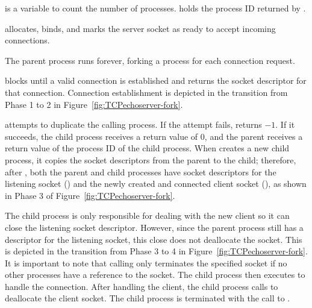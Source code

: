 \begin{topcode}



 is a variable to count the number of processes.
 holds the process ID returned by .


 allocates, binds, and marks the server
socket as ready to accept incoming connections.


The parent process runs forever, forking a process for each connection
request.

\begin{bottomcode}


 blocks until a valid connection is established
and returns the socket descriptor for that connection.
Connection establishment is depicted in the transition from Phase 1 to
2 in Figure~\ref{fig:TCPechoserver-fork}.


 attempts to duplicate the calling
process. If the attempt fails,  returns
$-1$.  If it succeeds, the child process
receives a return value of $0$, and the parent receives a
return value of the process ID of the child process.
When  creates a new child process, it copies the
socket descriptors from the parent to the child; therefore, after
,
both the parent and child processes have socket descriptors for the listening
socket () and the newly created and connected client
socket (),
as shown in Phase 3 of Figure~\ref{fig:TCPechoserver-fork}.


The child process is only responsible for dealing
with the new client so it can close the listening socket
descriptor. However, since the parent process still has a descriptor
for the listening socket, this close does not deallocate the socket.  This
is depicted in the transition from Phase 3 to 4 in
Figure~\ref{fig:TCPechoserver-fork}.  It is important to note that
calling  only terminates the specified socket
if no other processes have a reference to the socket.  The
child process then executes  to handle the
connection.  After handling the client, the child process calls
 to deallocate the client socket.  The child
process is terminated with the call to .


\end{bottomcode}
\end{topcode}
